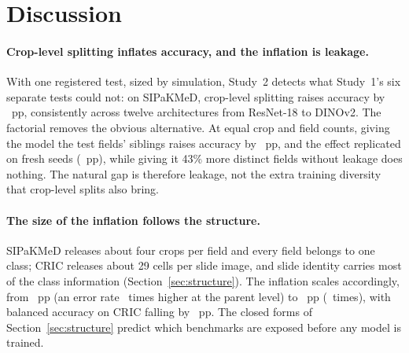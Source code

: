 \section{Discussion}
\label{sec:discussion}

\paragraph{Crop-level splitting inflates accuracy, and the inflation is leakage.} With one
registered test, sized by simulation, Study~2 detects what Study~1's six separate tests could
not: on SIPaKMeD, crop-level splitting raises accuracy by \HoneEst~pp, consistently across
twelve architectures from ResNet-18 to DINOv2. The factorial removes the obvious alternative.
At equal crop and field counts, giving the model the test fields' siblings raises accuracy by
\HthreeEst~pp, and the effect replicated on fresh seeds (\HthreeRepEst~pp), while giving it 43\%
more distinct fields without leakage does nothing. The natural gap is therefore leakage, not
the extra training diversity that crop-level splits also bring.

\paragraph{The size of the inflation follows the structure.} SIPaKMeD releases about four crops
per field and every field belongs to one class; CRIC releases about 29 cells per slide image,
and slide identity carries most of the class information (Section~\ref{sec:structure}). The
inflation scales accordingly, from \HoneEst~pp (an error rate \SipErrorRatio\ times higher at
the parent level) to \HtwoEst~pp (\CricErrorRatio\ times), with balanced accuracy on CRIC
falling by \CricBaccEst~pp. The closed forms of Section~\ref{sec:structure} predict which
benchmarks are exposed before any model is trained.

